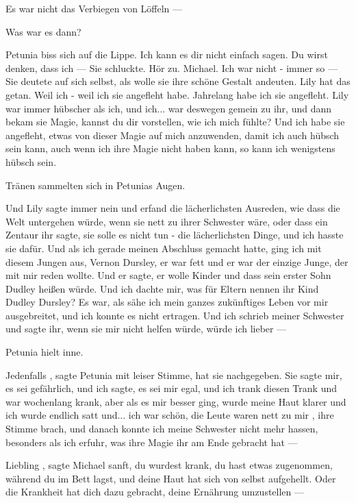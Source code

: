 \glqq Es war nicht das Verbiegen von Löffeln ---\grqq{}

\glqq Was war es dann?\grqq{}

Petunia biss sich auf die Lippe. \glqq Ich kann es dir nicht einfach sagen. Du wirst
denken, dass ich ---\grqq{} Sie schluckte. \glqq Hör zu. Michael. Ich war nicht -
immer so ---\grqq{} Sie deutete auf sich selbst, als wolle sie ihre schöne
Gestalt andeuten. \glqq Lily hat das getan. Weil ich - weil ich sie angefleht habe.
Jahrelang habe ich sie angefleht. Lily war immer hübscher als ich, und ich...
war deswegen gemein zu ihr, und dann bekam sie Magie, kannst du dir vorstellen,
wie ich mich fühlte? Und ich habe sie angefleht, etwas von dieser Magie auf mich
anzuwenden, damit ich auch hübsch sein kann, auch wenn ich ihre Magie nicht
haben kann, so kann ich wenigstens hübsch sein.\grqq{}

Tränen sammelten sich in Petunias Augen.

\glqq Und Lily sagte immer nein und erfand die lächerlichsten Ausreden, wie dass die
Welt untergehen würde, wenn sie nett zu ihrer Schwester wäre, oder dass ein
Zentaur ihr sagte, sie solle es nicht tun - die lächerlichsten Dinge, und ich
hasste sie dafür. Und als ich gerade meinen Abschluss gemacht hatte, ging ich
mit diesem Jungen aus, Vernon Dursley, er war fett und er war der einzige Junge,
der mit mir reden wollte. Und er sagte, er wolle Kinder und dass sein erster
Sohn Dudley heißen würde. Und ich dachte mir, was für Eltern nennen ihr Kind
Dudley Dursley? Es war, als sähe ich mein ganzes zukünftiges Leben vor mir
ausgebreitet, und ich konnte es nicht ertragen. Und ich schrieb meiner Schwester
und sagte ihr, wenn sie mir nicht helfen würde, würde ich lieber ---\grqq{}

Petunia hielt inne.

\glqq Jedenfalls\grqq{} , sagte Petunia mit leiser Stimme, \glqq hat sie nachgegeben. Sie sagte
mir, es sei gefährlich, und ich sagte, es sei mir egal, und ich trank diesen
Trank und war wochenlang krank, aber als es mir besser ging, wurde meine Haut
klarer und ich wurde endlich satt und... ich war schön, die Leute waren nett zu
mir\grqq{} , ihre Stimme brach, \glqq und danach konnte ich meine Schwester nicht mehr
hassen, besonders als ich erfuhr, was ihre Magie ihr am Ende gebracht hat
---\grqq{}

\glqq Liebling\grqq{} , sagte Michael sanft, \glqq du wurdest krank, du hast etwas zugenommen,
während du im Bett lagst, und deine Haut hat sich von selbst aufgehellt. Oder
die Krankheit hat dich dazu gebracht, deine Ernährung umzustellen ---\grqq{}

